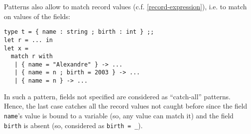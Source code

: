 \smallskip
Patterns also allow to match record values
(c.f. \ref{record-expression}), i.e. to match on values of the fields:
{\scriptsize
\begin{lstlisting}
type t = { name : string ; birth : int } ;;
let r = ... in
let x =
  match r with
   | { name = "Alexandre" } -> ...
   | { name = n ; birth = 2003 } -> ...
   | { name = n } -> ...
\end{lstlisting}
}
In such a pattern, fields not specified are considered as
``catch-all'' patterns. Hence, the last case catches all the record
values not caught before since the field {\tt name}'s value is bound
to a variable (so, any value can match it) and the field
{\tt birth} is absent (so, considered as {\tt birth = \_}).



